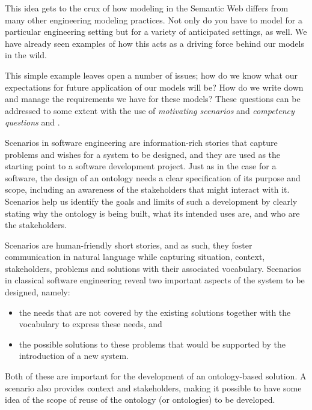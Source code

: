 This idea gets to the crux of how modeling in the Semantic Web differs
from many other engineering
modeling practices. Not only do you have to model for a particular
engineering setting but for a variety of anticipated settings, as well.
We have already seen examples of how this acts as a driving force behind
our models in the wild.

This simple example leaves open a number of issues; how do we know what our expectations 
for future application of our models will be?  How do we write down and manage
the requirements we have for these models?  These questions can be addressed to some 
extent with the use of  \emph{motivating scenarios} and \emph{competency
questions} \cite{uschold1996ontologies} and \cite{doi:10.2200/S00834ED1V01Y201802WBE018}. %


Scenarios in software engineering are information-rich stories that  capture problems and 
wishes for a system to be designed, and they are used as the starting point to a software 
development project. Just as in the case for a software, the design of an ontology needs 
a clear specification of its purpose and scope, including an awareness of the 
stakeholders that might interact with it. Scenarios help us identify the goals and limits 
of such a development by clearly stating why the ontology is being built, what its 
intended uses are, and who are the stakeholders.

Scenarios are human-friendly short stories, and as such, they foster communication in 
natural language while capturing situation, context, stakeholders, problems and solutions 
with their associated vocabulary.  Scenarios in classical software engineering reveal two 
important aspects of the system to be designed, namely: 

\begin{itemize}
    \item the needs that are not covered by the existing solutions together with the vocabulary to express these needs, and
    \item the possible solutions to these problems that would be supported by the introduction of a new system. 
\end{itemize}

Both of these are important for the development of an ontology-based solution.  A scenario 
also provides context and stakeholders, making it possible to have some idea  of the scope 
of reuse of the ontology (or ontologies) to be developed.  

